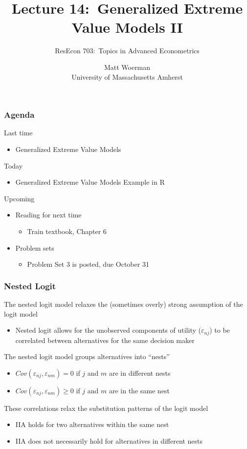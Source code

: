 \documentclass{beamer}
\title[Lecture 14:\ Generalized Extreme Value Models II]{Lecture 14:\ Generalized Extreme Value Models II}
\author[ResEcon 703:\ Advanced Econometrics]{ResEcon 703:\ Topics in Advanced Econometrics}
\date{Matt Woerman\\University of Massachusetts Amherst}
\begin{document}
{ 
\begin{frame}[noframenumbering]
    \titlepage
\end{frame}
}

\begin{frame}\frametitle{Agenda}
    Last time
    \begin{itemize}
        \item Generalized Extreme Value Models
    \end{itemize}
    \vspace{2ex}
    Today
    \begin{itemize}
        \item Generalized Extreme Value Models Example in R
    \end{itemize}
    \vspace{2ex}
    Upcoming
    \begin{itemize}
        \item Reading for next time
        \begin{itemize}
            \item Train textbook, Chapter 6
        \end{itemize}
        \item Problem sets
        \begin{itemize}
            \item Problem Set 3 is posted, due October 31
        \end{itemize}
    \end{itemize}
\end{frame}

\begin{frame}\frametitle{Nested Logit}
    The nested logit model relaxes the (sometimes overly) strong assumption of the logit model
    \begin{itemize}
    	\item Nested logit allows for the unobserved components of utility ($\varepsilon_{nj}$) to be correlated between alternatives for the same decision maker
    \end{itemize}
    \vspace{2ex}
    The nested logit model groups alternatives into ``nests''
    \begin{itemize}
    	\item $Cov(\varepsilon_{nj}, \varepsilon_{nm}) = 0$ if $j$ and $m$ are in different nests
    	\item $Cov(\varepsilon_{nj}, \varepsilon_{nm}) \geq 0$ if $j$ and $m$ are in the same nest
    \end{itemize}
    \vspace{2ex}
    These correlations relax the substitution patterns of the logit model
    \begin{itemize}
    	\item IIA holds for two alternatives within the same nest
    	\item IIA does not necessarily hold for alternatives in different nests
    \end{itemize}
\end{frame}
\end{document}
